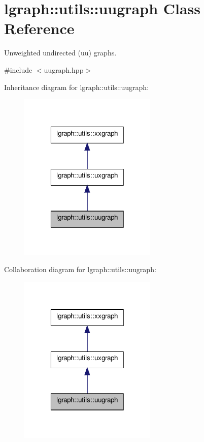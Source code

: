 \hypertarget{classlgraph_1_1utils_1_1uugraph}{\section{lgraph\-:\-:utils\-:\-:uugraph Class Reference}
\label{classlgraph_1_1utils_1_1uugraph}
}


Unweighted undirected (uu) graphs.  




{\ttfamily \#include $<$uugraph.\-hpp$>$}



Inheritance diagram for lgraph\-:\-:utils\-:\-:uugraph\-:\nopagebreak
\begin{figure}[H]
\begin{center}
\leavevmode
\includegraphics[width=186pt]{classlgraph_1_1utils_1_1uugraph__inherit__graph}
\end{center}
\end{figure}


Collaboration diagram for lgraph\-:\-:utils\-:\-:uugraph\-:\nopagebreak
\begin{figure}[H]
\begin{center}
\leavevmode
\includegraphics[width=186pt]{classlgraph_1_1utils_1_1uugraph__coll__graph}
\end{center}
\end{figure}
